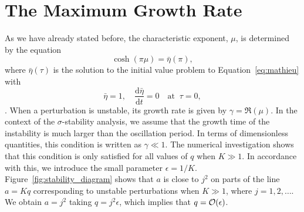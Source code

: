 
\chapter{The Maximum Growth Rate}
\label{sec:appendix}

As we have already stated before, the characteristic exponent, $\mu$, is determined by the equation
%
\begin{equation}
\label{eq:A1}
\cosh(\pi \mu) = \bar\eta(\pi),
\end{equation}
%
where $\bar\eta(\tau)$ is the solution to the initial value problem to Equation~\eqref{eq:mathieu} with
%
\begin{equation}
\label{eq:A2}
\bar\eta = 1, \quad \frac{\mathrm{d} \bar\eta}{\mathrm{d} t} = 0 \quad 
\mbox{at} \;\; \tau = 0,
\end{equation}
%
\citep{Abramowitz1965}.
When a perturbation is unstable, its growth rate is given by $\gamma = \Re(\mu)$.
In the context of the $\sigma$-stability analysis, we assume that the growth time of the instability is much larger than the oscillation period.
In terms of dimensionless quantities, this condition is written as $\gamma \ll 1$.
The numerical investigation shows that this condition is only satisfied for all values of $q$ when $K \gg 1$.
In accordance with this, we introduce the small parameter $\epsilon = 1 / K$\/.
Figure~\ref{fig:stability_diagram} shows that $a$ is close to $j^2$ on parts of the line $a = Kq$ corresponding to unstable perturbations when $K \gg 1$, where $j = 1,2,\dots$.
We obtain $a = j^2$ taking $q = j^2\epsilon$\/, which implies that $q = {\cal O}(\epsilon)$.

